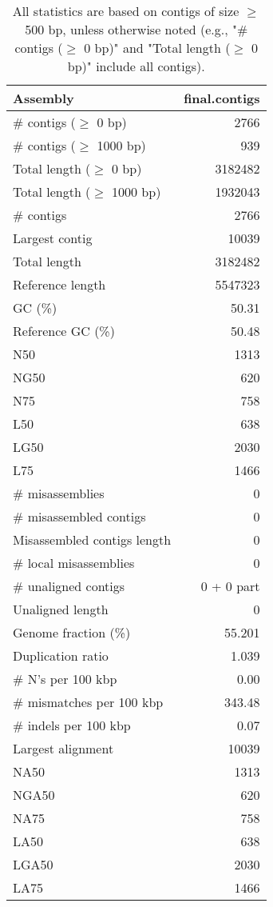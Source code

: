 \documentclass[12pt,a4paper]{article}
\begin{document}
\begin{table}[ht]
\begin{center}
\caption{All statistics are based on contigs of size $\geq$ 500 bp, unless otherwise noted (e.g., "\# contigs ($\geq$ 0 bp)" and "Total length ($\geq$ 0 bp)" include all contigs).}
\begin{tabular}{|l*{1}{|r}|}
\hline
Assembly & final.contigs \\ \hline
\# contigs ($\geq$ 0 bp) & 2766 \\ \hline
\# contigs ($\geq$ 1000 bp) & 939 \\ \hline
Total length ($\geq$ 0 bp) & 3182482 \\ \hline
Total length ($\geq$ 1000 bp) & 1932043 \\ \hline
\# contigs & 2766 \\ \hline
Largest contig & 10039 \\ \hline
Total length & 3182482 \\ \hline
Reference length & 5547323 \\ \hline
GC (\%) & 50.31 \\ \hline
Reference GC (\%) & 50.48 \\ \hline
N50 & 1313 \\ \hline
NG50 & 620 \\ \hline
N75 & 758 \\ \hline
L50 & 638 \\ \hline
LG50 & 2030 \\ \hline
L75 & 1466 \\ \hline
\# misassemblies & 0 \\ \hline
\# misassembled contigs & 0 \\ \hline
Misassembled contigs length & 0 \\ \hline
\# local misassemblies & 0 \\ \hline
\# unaligned contigs & 0 + 0 part \\ \hline
Unaligned length & 0 \\ \hline
Genome fraction (\%) & 55.201 \\ \hline
Duplication ratio & 1.039 \\ \hline
\# N's per 100 kbp & 0.00 \\ \hline
\# mismatches per 100 kbp & 343.48 \\ \hline
\# indels per 100 kbp & 0.07 \\ \hline
Largest alignment & 10039 \\ \hline
NA50 & 1313 \\ \hline
NGA50 & 620 \\ \hline
NA75 & 758 \\ \hline
LA50 & 638 \\ \hline
LGA50 & 2030 \\ \hline
LA75 & 1466 \\ \hline
\end{tabular}
\end{center}
\end{table}
\end{document}
